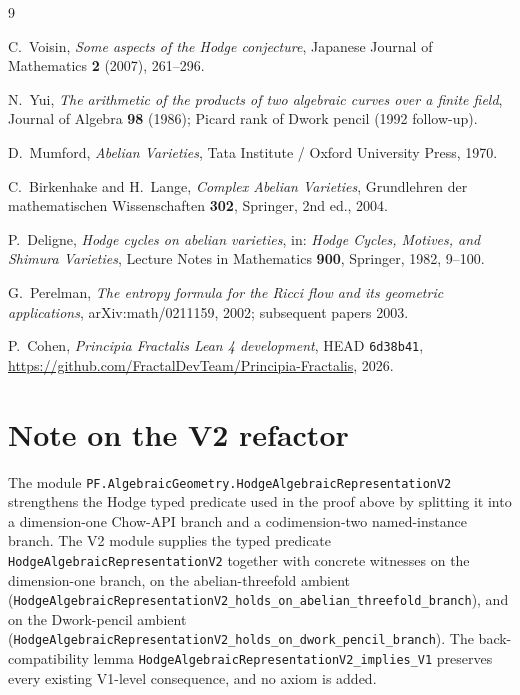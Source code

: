 \documentclass[11pt,a4paper]{article}
\theoremstyle{plain}
\theoremstyle{definition}
\begin{document}
\begin{thebibliography}{9}

C.~Voisin,
\emph{Some aspects of the Hodge conjecture},
Japanese Journal of Mathematics \textbf{2} (2007), 261--296.

N.~Yui,
\emph{The arithmetic of the products of two algebraic curves over a
finite field},
Journal of Algebra \textbf{98} (1986); Picard rank of Dwork pencil
(1992 follow-up).

D.~Mumford,
\emph{Abelian Varieties},
Tata Institute / Oxford University Press, 1970.

C.~Birkenhake and H.~Lange,
\emph{Complex Abelian Varieties},
Grundlehren der mathematischen Wissenschaften \textbf{302},
Springer, 2nd ed., 2004.

P.~Deligne,
\emph{Hodge cycles on abelian varieties},
in: \emph{Hodge Cycles, Motives, and Shimura Varieties},
Lecture Notes in Mathematics \textbf{900}, Springer, 1982,
9--100.

G.~Perelman,
\emph{The entropy formula for the Ricci flow and its geometric
applications},
arXiv:math/0211159, 2002; subsequent papers 2003.

P.~Cohen,
\emph{Principia Fractalis Lean 4 development},
HEAD \texttt{6d38b41},
\url{https://github.com/FractalDevTeam/Principia-Fractalis}, 2026.

\end{thebibliography}

\section*{Note on the V2 refactor}

The module
\texttt{PF.AlgebraicGeometry.HodgeAlgebraicRepresentationV2}
strengthens the Hodge typed predicate used in the proof above by
splitting it into a dimension-one Chow-API branch and a
codimension-two named-instance branch.  The V2 module supplies the
typed predicate
\texttt{HodgeAlgebraicRepresentationV2} together with concrete
witnesses on the dimension-one branch, on the abelian-threefold
ambient (\texttt{HodgeAlgebraicRepresentationV2\_holds\_on\_abelian\_threefold\_branch}),
and on the Dwork-pencil ambient
(\texttt{HodgeAlgebraicRepresentationV2\_holds\_on\_dwork\_pencil\_branch}).
The back-compatibility lemma
\texttt{HodgeAlgebraicRepresentationV2\_implies\_V1} preserves every
existing V1-level consequence, and no axiom is added.
\end{document}
